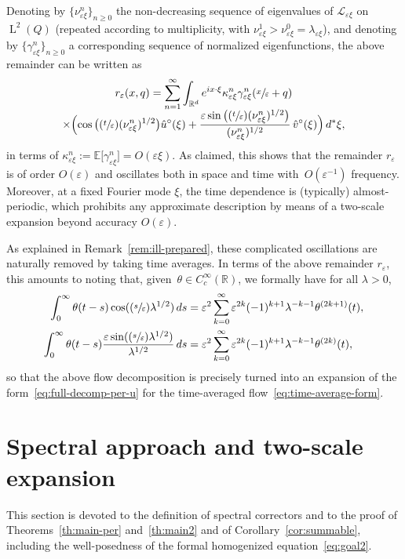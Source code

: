 \documentclass[JEP,XML,SOM,Unicode,published]{cedram}
\newcommand{\Psfrac}[2]{(\sfrac{#1}{#2})}
\theoremstyle{plain}
\theoremstyle{definition}
\numberwithin{equation}{section}
\newcommand{\e}{\varepsilon}
\newcommand{\Lc}{\mathcal{L}}
\newcommand{\R}{\mathbb R}
\newcommand{\Ld}{\operatorname{L}}
\newcommand{\expecm}[1]{\mathbb{E}\bigl[ #1 \bigr]}\let\bexpec\expecm
\begin{document}
Denoting by $\{\nu_{\e\xi}^n\}_{n\ge0}$ the non-decreasing sequence of eigenvalues of $\Lc_{\e\xi}$ on $\Ld^2(Q)$ (repeated according to multiplicity, with $\nu_{\e\xi}^1>\nu_{\e\xi}^0=\lambda_{\e\xi}$), and denoting by $\{\gamma_{\e\xi}^n\}_{n\ge0}$ a corresponding sequence of normalized eigenfunctions, the above remainder can be written as
\begin{multline*}
r_\e(x,q)
=\sum_{n=1}^\infty\int_{\R^d}e^{ix\cdot\xi}\kappa^n_{\e\xi}\gamma_{\e\xi}^n(\sfrac x\e+q)\\[-5pt]
\times\Bigl(\cos\big(\Psfrac t\e(\nu_{\e\xi}^n)^{1/2}\big)\hat u^\circ(\xi)
+\frac{\e\sin\big(\Psfrac t\e(\nu^n_{\e\xi})^{1/2}\big)}{(\nu^n_{\e\xi})^{1/2}}\,\hat v^\circ(\xi)\Bigr)\,d^*\xi,
\end{multline*}
in terms of $\kappa^n_{\e\xi}:=\expecm{\gamma_{\e\xi}^n}=O(\e\xi)$.
As claimed, this shows that the remainder $r_{\e}$ is of order $O(\e)$ and oscillates both in space and time with~$O(\e^{-1})$ frequency. Moreover, at a fixed Fourier mode $\xi$, the time dependence is (typically) almost-periodic, which prohibits any approximate description by means of a two-scale expansion beyond accuracy $O(\e)$.

As explained in Remark~\ref{rem:ill-prepared}, these complicated oscillations are naturally removed by taking time averages. In terms of the above remainder $r_\e$, this amounts to noting that, given~$\theta\in C^\infty_c(\R)$, we formally have for all $\lambda>0$,
\begin{align*}
\int_0^\infty\theta(t-s)\cos(\Psfrac s\e\lambda^{1/2})\,ds
&=\e^2\sum_{k=0}^\infty\e^{2k}{(-1)^{k+1}}\lambda^{-k-1}\theta^{(2k+1)}(t),\\
\int_0^\infty\theta(t-s)\frac{\e\sin(\Psfrac s\e\lambda^{1/2})}{\lambda^{1/2}}\,ds
&=\e^2\sum_{k=0}^\infty\e^{2k}{(-1)^{k+1}}\lambda^{-k-1}\theta^{(2k)}(t),
\end{align*}
so that the above flow decomposition is precisely turned into an expansion of the form~\eqref{eq:full-decomp-per-u} for the time-averaged flow~\eqref{eq:time-average-form}.

\section{Spectral approach and two-scale expansion}\label{sec:spectral}
This section is devoted to the definition of spectral correctors and to the proof of Theorems~\ref{th:main-per} and~\ref{th:main2} and of Corollary~\ref{cor:summable}, including the well-posedness of the formal homogenized equation~\eqref{eq:goal2}.
\end{document}
